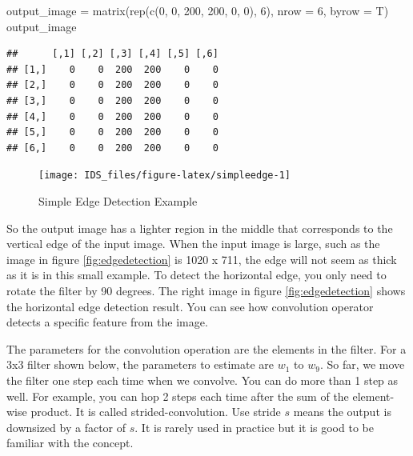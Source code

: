 \documentclass[
  12pt,
]{krantz}
\makeatletter
\newenvironment{Shaded}{\begin{snugshade}}{\end{snugshade}}
\newcommand{\AttributeTok}[1]{\textcolor[rgb]{0.61,0.61,0.61}{#1}}
\newcommand{\DecValTok}[1]{\textcolor[rgb]{0.06,0.06,0.06}{#1}}
\newcommand{\FunctionTok}[1]{\textcolor[rgb]{0,0,0}{#1}}
\newcommand{\NormalTok}[1]{#1}
\newcommand{\OtherTok}[1]{\textcolor[rgb]{0.37,0.37,0.37}{#1}}
\newenvironment{kframe}{%
\medskip{}
\setlength{\fboxsep}{.8em}
 \def\at@end@of@kframe{}%
 \ifinner\ifhmode%
  \def\at@end@of@kframe{\end{minipage}}%
  \begin{minipage}{\columnwidth}%
 \fi\fi%
 \def\FrameCommand##1{\hskip\@totalleftmargin \hskip-\fboxsep
 \colorbox{shadecolor}{##1}\hskip-\fboxsep
     \hskip-\linewidth \hskip-\@totalleftmargin \hskip\columnwidth}%
 \MakeFramed {\advance\hsize-\width
   \@totalleftmargin\z@ \linewidth\hsize
   \@setminipage}}%
 {\par\unskip\endMakeFramed%
 \at@end@of@kframe}
\renewenvironment{Shaded}{\begin{kframe}}{\end{kframe}}
\makeatother
\begin{document}
\begin{Shaded}
\begin{Highlighting}[]
\NormalTok{output\_image }\OtherTok{=} \FunctionTok{matrix}\NormalTok{(}\FunctionTok{rep}\NormalTok{(}\FunctionTok{c}\NormalTok{(}\DecValTok{0}\NormalTok{, }\DecValTok{0}\NormalTok{, }\DecValTok{200}\NormalTok{, }\DecValTok{200}\NormalTok{, }\DecValTok{0}\NormalTok{, }\DecValTok{0}\NormalTok{), }\DecValTok{6}\NormalTok{),}
                      \AttributeTok{nrow =} \DecValTok{6}\NormalTok{, }\AttributeTok{byrow =}\NormalTok{ T)}
\NormalTok{output\_image}
\end{Highlighting}
\end{Shaded}

\begin{verbatim}
##      [,1] [,2] [,3] [,4] [,5] [,6]
## [1,]    0    0  200  200    0    0
## [2,]    0    0  200  200    0    0
## [3,]    0    0  200  200    0    0
## [4,]    0    0  200  200    0    0
## [5,]    0    0  200  200    0    0
## [6,]    0    0  200  200    0    0
\end{verbatim}

\begin{figure}

{\centering \texttt{[image: IDS\_files/figure-latex/simpleedge-1]} 

}

\caption{Simple Edge Detection Example}\label{fig:simpleedge}
\end{figure}

So the output image has a lighter region in the middle that corresponds to the vertical edge of the input image. When the input image is large, such as the image in figure \ref{fig:edgedetection} is 1020 x 711, the edge will not seem as thick as it is in this small example. To detect the horizontal edge, you only need to rotate the filter by 90 degrees. The right image in figure \ref{fig:edgedetection} shows the horizontal edge detection result. You can see how convolution operator detects a specific feature from the image.

The parameters for the convolution operation are the elements in the filter. For a 3x3 filter shown below, the parameters to estimate are \(w_1\) to \(w_9\). So far, we move the filter one step each time when we convolve. You can do more than 1 step as well. For example, you can hop 2 steps each time after the sum of the element-wise product. It is called strided-convolution. Use stride \(s\) means the output is downsized by a factor of \(s\). It is rarely used in practice but it is good to be familiar with the concept.
\end{document}
